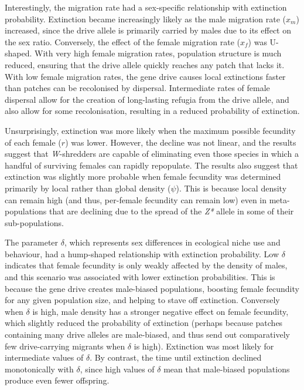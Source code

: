 \documentclass[]{rsos}%
\begin{document}
Interestingly, the migration rate had a sex-specific relationship with
extinction probability. Extinction became increasingly likely as the
male migration rate (\(x_m\)) increased, since the drive allele is
primarily carried by males due to its effect on the sex ratio.
Conversely, the effect of the female migration rate (\(x_f\)) was
U-shaped. With very high female migration rates, population structure is
much reduced, ensuring that the drive allele quickly reaches any patch
that lacks it. With low female migration rates, the gene drive causes
local extinctions faster than patches can be recolonised by dispersal.
Intermediate rates of female dispersal allow for the creation of
long-lasting refugia from the drive allele, and also allow for some
recolonisation, resulting in a reduced probability of extinction.

Unsurprisingly, extinction was more likely when the maximum possible
fecundity of each female (\(r\)) was lower. However, the decline was not
linear, and the results suggest that \emph{W}-shredders are capable of
eliminating even those species in which a handful of surviving females
can rapidly repopulate. The results also suggest that extinction was
slightly more probable when female fecundity was determined primarily by
local rather than global density (\(\psi\)). This is because local
density can remain high (and thus, per-female fecundity can remain low)
even in meta-populations that are declining due to the spread of the
\emph{Z*} allele in some of their sub-populations.

The parameter \(\delta\), which represents sex differences in ecological
niche use and behaviour, had a hump-shaped relationship with extinction
probability. Low \(\delta\) indicates that female fecundity is only
weakly affected by the density of males, and this scenario was
associated with lower extinction probabilities. This is because the gene
drive creates male-biased populations, boosting female fecundity for any
given population size, and helping to stave off extinction. Conversely
when \(\delta\) is high, male density has a stronger negative effect on
female fecundity, which slightly reduced the probability of extinction
(perhaps because patches containing many drive alleles are male-biased,
and thus send out comparatively few drive-carrying migrants when
\(\delta\) is high). Extinction was most likely for intermediate values
of \(\delta\). By contrast, the time until extinction declined
monotonically with \(\delta\), since high values of \(\delta\) mean that
male-biased populations produce even fewer offspring.
\end{document}
